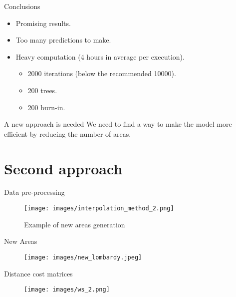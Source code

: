 \documentclass[10pt]{beamer}
\begin{document}
\begin{frame}{Conclusions}
    \begin{itemize}
        \item Promising results.
        \item Too many predictions to make.
        \item Heavy computation (4 hours in average per execution).
              \begin{itemize}
                  \item 2000 iterations (below the recommended 10000).
                  \item 200 trees.
                  \item 200 burn-in.
              \end{itemize}
    \end{itemize}
    \begin{block}{A new approach is needed}
        We need to find a way to make the model more efficient by reducing the number of areas.
    \end{block}
\end{frame}

\section{Second approach}


\begin{frame}{Data pre-processing}
    \begin{figure}
        \texttt{[image: images/interpolation\_method\_2.png]}
        \caption{Example of new areas generation}
    \end{figure}
\end{frame}

\begin{frame}{New Areas}
    \begin{figure}
        \texttt{[image: images/new\_lombardy.jpeg]}
        \caption{}
    \end{figure}
\end{frame}

\begin{frame}{Distance cost matrices}
    \begin{figure}
        \texttt{[image: images/ws\_2.png]}
        \caption{}
    \end{figure}
\end{frame}
\end{document}

